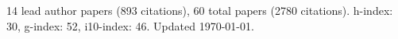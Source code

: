14 lead author papers (893 citations),
60 total papers (2780 citations).\newline
h-index: 30, g-index: 52, i10-index: 46. Updated \today.